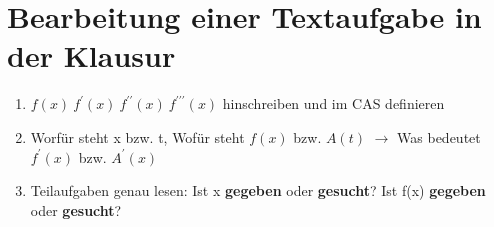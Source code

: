 	\section*{Bearbeitung einer Textaufgabe in der Klausur}
	\begin{enumerate}
		\item $f(x) \ f^{\prime}(x) \ f^{\prime\prime}(x) \ f^{\prime\prime\prime}(x)$ hinschreiben und im CAS definieren
		\item Worfür steht x bzw. t, Wofür steht $f(x)$ bzw. $A(t)$ $\rightarrow$ Was bedeutet $f^{\prime}(x)$ bzw. $A^{\prime}(x)$
		\item Teilaufgaben genau lesen: Ist x \textbf{gegeben} oder \textbf{gesucht}? Ist f(x) \textbf{gegeben} oder \textbf{gesucht}?	
	\end{enumerate}